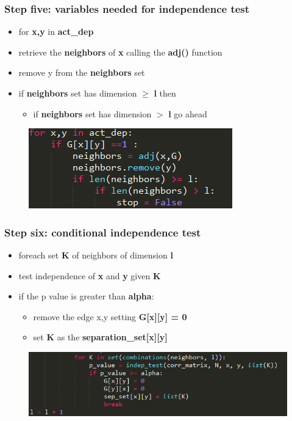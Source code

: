 \documentclass[xcolor ={table,usenames,dvipsnames}]{beamer}
\theoremstyle{definition}
\begin{document}
\begin{frame}
\frametitle{Step five: variables needed for independence test}
\begin{itemize}
	\item for \textbf{x,y} in \textbf{act\_dep}
	\item retrieve the \textbf{neighbors} of \textbf{x} calling the \textbf{adj()} function
	\item remove y from the \textbf{neighbors} set
	\item if \textbf{neighbors} set has dimension $\ge$ \textbf{l} then \begin{itemize}
	\item if \textbf{neighbors} set has dimension $>$ \textbf{l} go ahead
	\end{itemize}
\end{itemize}
	\begin{figure}[h!]
		\centering
		\includegraphics[scale=0.5]{img/indepvar.PNG}
	\end{figure}
\end{frame}
\begin{frame}
\frametitle{Step six: conditional independence test}
\begin{itemize}
	\item foreach set \textbf{K} of neighbors of dimension \textbf{l}
	\item test independence of \textbf{x} and \textbf{y} given \textbf{K}
	\item if the p value is greater than \textbf{alpha}:
	\begin{itemize}
		\item remove the edge x,y setting \textbf{G[x][y] = 0}
		\item set \textbf{K} as the \textbf{separation\_set[x][y]}
	\end{itemize}
\end{itemize}
	\begin{figure}[h!]
		\centering
		\includegraphics[scale=0.5]{img/indeptest.PNG}
		\label{Interfacce di un CS}
	\end{figure}
\end{frame}
\end{document}
